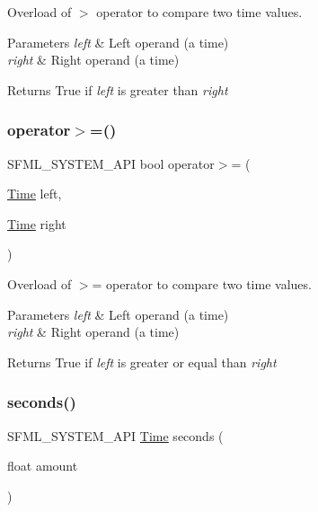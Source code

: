 Overload of $>$ operator to compare two time values. 


\begin{DoxyParams}{Parameters}
{\em left} & Left operand (a time) \\
\hline
{\em right} & Right operand (a time)\\
\hline
\end{DoxyParams}
\begin{DoxyReturn}{Returns}
True if {\itshape left} is greater than {\itshape right} 
\end{DoxyReturn}
\mbox{\label{classsf_1_1_time_ad69edc80cd01b7a03f5673b4276181eb}} 
\subsubsection{\texorpdfstring{operator$>$=()}{operator>=()}}
{\footnotesize\ttfamily S\+F\+M\+L\+\_\+\+S\+Y\+S\+T\+E\+M\+\_\+\+A\+PI bool operator$>$= (\begin{DoxyParamCaption}\item[{\hyperlink{classsf_1_1_time}{Time}}]{left,  }\item[{\hyperlink{classsf_1_1_time}{Time}}]{right }\end{DoxyParamCaption})\hspace{0.3cm}{\ttfamily [related]}}



Overload of $>$= operator to compare two time values. 


\begin{DoxyParams}{Parameters}
{\em left} & Left operand (a time) \\
\hline
{\em right} & Right operand (a time)\\
\hline
\end{DoxyParams}
\begin{DoxyReturn}{Returns}
True if {\itshape left} is greater or equal than {\itshape right} 
\end{DoxyReturn}
\mbox{\label{classsf_1_1_time_ae36b9ef700f0ed0516abf0194ceb546b}} 
\subsubsection{\texorpdfstring{seconds()}{seconds()}}
{\footnotesize\ttfamily S\+F\+M\+L\+\_\+\+S\+Y\+S\+T\+E\+M\+\_\+\+A\+PI \hyperlink{classsf_1_1_time}{Time} seconds (\begin{DoxyParamCaption}\item[{float}]{amount }\end{DoxyParamCaption})\hspace{0.3cm}{\ttfamily [related]}}



